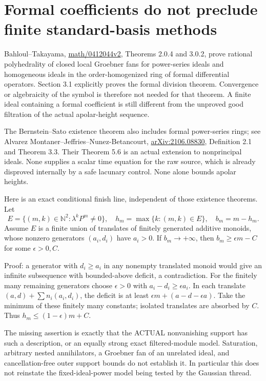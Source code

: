 \documentclass{article}
\begin{document}
\section{Formal coefficients do not preclude finite standard-basis methods}
Bahloul--Takayama, \href{https://arxiv.org/abs/math/0412044v2}{math/0412044v2}, Theorems 2.0.4 and 3.0.2, prove rational polyhedrality of closed local Groebner fans for power-series ideals and homogeneous ideals in the order-homogenized ring of formal differential operators. Section 3.1 explicitly proves the formal division theorem. Convergence or algebraicity of the symbol is therefore not needed for that theorem. A finite ideal containing a formal coefficient is still different from the unproved good filtration of the actual apolar-height sequence.

The Bernstein--Sato existence theorem also includes formal power-series rings; see Alvarez Montaner--Jeffries--Nunez-Betancourt, \href{https://arxiv.org/abs/2106.08830}{arXiv:2106.08830}, Definition 2.1 and Theorem 3.3. Their Theorem 5.6 is an actual extension to nonprincipal ideals. None supplies a scalar time equation for the raw source, which is already disproved internally by a safe lacunary control. None alone bounds apolar heights.

Here is an exact conditional finish line, independent of those existence theorems. Let
\[
 E=\{(m,k)\in\mathbb N^2: \lambda^kP^m\ne0\},\quad
 h_m=\max\{k:(m,k)\in E\},\quad b_m=m-h_m.
\]
Assume $E$ is a finite union of translates of finitely generated additive monoids, whose nonzero generators $(a_i,d_i)$ have $a_i>0$. If $b_m\to+\infty$, then $b_m\ge\epsilon m-C$ for some $\epsilon>0,C$.

Proof: a generator with $d_i\ge a_i$ in any nonempty translated monoid would give an infinite subsequence with bounded-above deficit, a contradiction. For the finitely many remaining generators choose $\epsilon>0$ with $a_i-d_i\ge\epsilon a_i$. In each translate $(a,d)+\sum n_i(a_i,d_i)$, the deficit is at least $\epsilon m+(a-d-\epsilon a)$. Take the minimum of these finitely many constants; isolated translates are absorbed by $C$. Thus $h_m\le(1-\epsilon)m+C$.

The missing assertion is exactly that the ACTUAL nonvanishing support has such a description, or an equally strong exact filtered-module model. Saturation, arbitrary nested annihilators, a Groebner fan of an unrelated ideal, and cancellation-free outer support bounds do not establish it. In particular this does not reinstate the fixed-ideal-power model being tested by the Gaussian thread.
\end{document}

